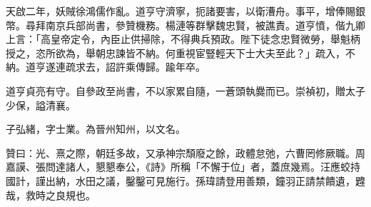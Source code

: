 \begin{pinyinscope}
天啟二年，妖賊徐鴻儒作亂。道亨守濟寧，扼諸要害，以衛漕舟。事平，增俸賜銀幣。尋拜南京兵部尚書，參贊機務。楊漣等群擊魏忠賢，被譙責。道亨憤，偕九卿上言：「高皇帝定令，內臣止供掃除，不得典兵預政。陛下徒念忠賢微勞，舉魁柄授之，恣所欲為，舉朝忠諫皆不納。何重視宦豎輕天下士大夫至此？」疏入，不納。道亨遂連疏求去，詔許乘傳歸。踰年卒。

道亨貞亮有守。自參政至尚書，不以家累自隨，一蒼頭執爨而已。崇禎初，贈太子少保，謚清襄。

子弘緒，字士業。為晉州知州，以文名。

贊曰：光、熹之際，朝廷多故，又承神宗頹廢之餘，政體怠弛，六曹罔修厥職。周嘉謨、張問達諸人，懇懇奉公，《詩》所稱「不懈于位」者，蓋庶幾焉。汪應蛟持國計，謹出納，水田之議，鑿鑿可見施行。孫瑋請登用善類，鐘羽正請禁饋遺，韙哉，救時之良規也。


\end{pinyinscope}